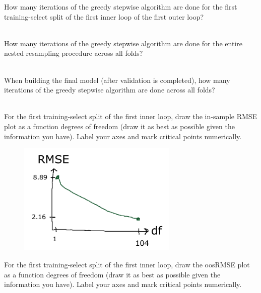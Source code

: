 \documentclass[12pt]{article}
\begin{document}
 How many iterations of the greedy stepwise algorithm are done for the first training-select split of the first inner loop of the first outer loop?\\~\\

 How many iterations of the greedy stepwise algorithm are done for the entire nested resampling procedure across all folds?\\~\\

\pagebreak

 When building the final model (after validation is completed), how many iterations of the greedy stepwise algorithm are done across all folds?\\~\\


 For the first training-select split of the first inner loop, draw the in-sample RMSE plot as a function degrees of freedom (draw it as best as possible given the information you have). Label your axes and mark critical points numerically.

 
\begin{figure}[htp]
\centering
\includegraphics[width=3in]{isRMSE}
\end{figure} 


 For the first training-select split of the first inner loop, draw the oosRMSE plot as a function degrees of freedom (draw it as best as possible given the information you have). Label your axes and mark critical points numerically.
\end{document}
